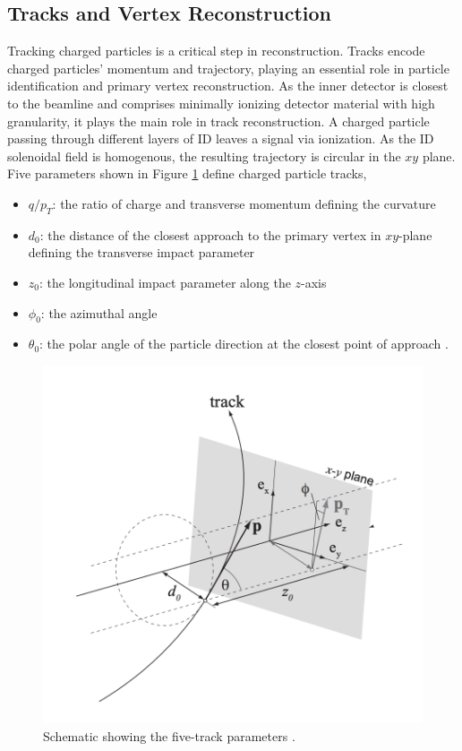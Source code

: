 \subsection{Tracks and Vertex Reconstruction}
\label{subsec:Tracking}
Tracking charged particles is a critical step in reconstruction. Tracks encode charged particles' momentum and trajectory, playing an essential role in particle identification and primary vertex reconstruction. As the inner detector is closest to the beamline and comprises minimally ionizing detector material with high granularity, it plays the main role in track reconstruction. A charged particle passing through different layers of ID leaves a signal via ionization. As the ID solenoidal field is homogenous, the resulting trajectory is circular in the $xy$ plane. Five parameters shown in Figure \ref{fig:TrackParameter} define charged particle tracks, 
\begin{itemize}
    \item{$q/p_{T}$: the ratio of charge and transverse momentum defining the curvature}
    \item{$d_{0}$: the distance of the closest approach to the primary vertex in $xy$-plane defining the transverse impact parameter}
    \item{$z_{0}$: the longitudinal impact parameter along the $z$-axis}
    \item{$\phi_{0}$: the azimuthal angle}
    \item{$\theta_{0}$: the polar angle of the particle direction at the closest point of approach \cite{TrackingRun2_ATLAS}.}
\end{itemize}

\begin{figure}[!htbp]
    \centering
    \includegraphics[width=.6\linewidth]{figures/LHC/TrackParameters.png}
    \caption{ Schematic showing the five-track parameters \cite{TrackParameterFig}.\label{fig:TrackParameter}}
\end{figure}

